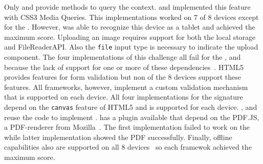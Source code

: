 \documentclass[a4paper]{artikel3}
\newcommand{\code}[1]{\texttt{#1}}
\begin{document}
\begin{table}[t]
\centering
{}
\caption{Performance for \st{}~(\sta), \kendo{}~(\kendoa), \jqm{}~(\jqma) en \lungo{}~(\lungoa). Less is better.}
\label{tabel:evaluatie-performantie}
\end{table}

Only \sta{} and \kendoa{} provide methods to query the context.
\jqma{} and \lungo{} implemented this feature with CSS3 Media Queries.
This implementations worked on $7$ of $8$ devices except for the \gtab.
However,  \kendoa{} was able to recognize this device as a tablet and achieved the maximum score.
Uploading an image requires support for both the local storage and FileReaderAPI.  
Also the \code{file} input type is necessary to indicate the upload component.
The four implementations of this challenge all fail for the \htc{}, \gtab{} and \ipadi{} because the lack of support for one or more of these dependencies~\cite{Deveria2013c}.
HTML5 provides features for form validation but non of the $8$ devices support these features.
All frameworks, however,  implement a custom validation mechanism that is supported on each device.
All four implementations for the signature depend on the \code{canvas} feature of HTML5 and is supported for each device.
\kendoa{}, \jqma{} and \lungo{} reuse the code to implement .
\sta{} has a plugin available that depend on the PDF.JS,  a PDF-renderer from Mozilla~\cite{Gal2010}.
The first implementation failed to work on the \gs{} while latter implementation showed the PDF successfully.
Finally, offline capabilities also are supported on all $8$ devices~\cite{Deveria2013c} so each framewok achieved the maximum score.
\end{document}
